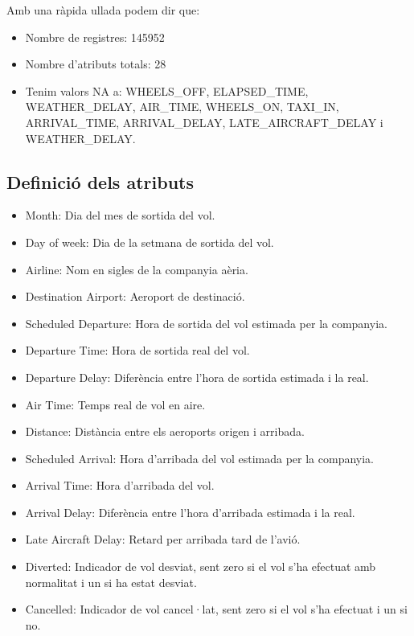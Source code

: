 \documentclass[
]{article}
\providecommand{\tightlist}{%
  \setlength{\itemsep}{0pt}\setlength{\parskip}{0pt}}
\begin{document}
Amb una ràpida ullada podem dir que:

\begin{itemize}
\tightlist
\item
  Nombre de registres: 145952
\item
  Nombre d'atributs totals: 28
\item
  Tenim valors NA a: WHEELS\_OFF, ELAPSED\_TIME, WEATHER\_DELAY,
  AIR\_TIME, WHEELS\_ON, TAXI\_IN, ARRIVAL\_TIME, ARRIVAL\_DELAY,
  LATE\_AIRCRAFT\_DELAY i WEATHER\_DELAY.
\end{itemize}

\hypertarget{definiciuxf3-dels-atributs}{%
\subsection{Definició dels atributs}\label{definiciuxf3-dels-atributs}}

\begin{itemize}
\tightlist
\item
  Month: Dia del mes de sortida del vol.
\item
  Day of week: Dia de la setmana de sortida del vol.
\item
  Airline: Nom en sigles de la companyia aèria.
\item
  Destination Airport: Aeroport de destinació.
\item
  Scheduled Departure: Hora de sortida del vol estimada per la
  companyia.
\item
  Departure Time: Hora de sortida real del vol.
\item
  Departure Delay: Diferència entre l'hora de sortida estimada i la
  real.
\item
  Air Time: Temps real de vol en aire.
\item
  Distance: Distància entre els aeroports origen i arribada.
\item
  Scheduled Arrival: Hora d'arribada del vol estimada per la companyia.
\item
  Arrival Time: Hora d'arribada del vol.
\item
  Arrival Delay: Diferència entre l'hora d'arribada estimada i la real.
\item
  Late Aircraft Delay: Retard per arribada tard de l'avió.
\item
  Diverted: Indicador de vol desviat, sent zero si el vol s'ha efectuat
  amb normalitat i un si ha estat desviat.
\item
  Cancelled: Indicador de vol cancel·lat, sent zero si el vol s'ha
  efectuat i un si no.
\end{itemize}
\end{document}
